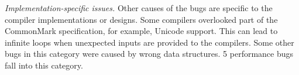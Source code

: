 \emph{Implementation-specific issues.}
Other causes of the bugs are specific to the compiler implementations or designs.
%
Some compilers overlooked part of the CommonMark specification, for example, Unicode support.
%
This can lead to infinite loops when unexpected inputs are provided to the compilers.
%
Some other bugs in this category were caused by wrong data structures.
%
5 performance bugs fall into this category.

